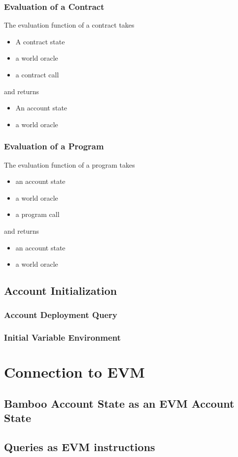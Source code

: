 \documentclass{book}
\begin{document}
\subsection{Evaluation of a Contract}

The evaluation function of a contract takes
\begin{itemize}
\item A contract state
\item a world oracle
\item a contract call
\end{itemize}
and returns
\begin{itemize}
\item An account state
\item a world oracle
\end{itemize}

\subsection{Evaluation of a Program}

The evaluation function of a program takes
\begin{itemize}
\item an account state
\item a world oracle
\item a program call
\end{itemize}
and returns
\begin{itemize}
\item an account state
\item a world oracle
\end{itemize}

\section{Account Initialization}

\subsection{Account Deployment Query}

\subsection{Initial Variable Environment}

\chapter{Connection to EVM}

\section{Bamboo Account State as an EVM Account State}

\section{Queries as EVM instructions}
\end{document}
